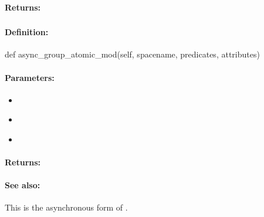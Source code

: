 \paragraph{Returns:}


\pagebreak
\subsubsection{}
\label{api:python:async_group_atomic_mod}


\paragraph{Definition:}
\begin{pythoncode}
def async_group_atomic_mod(self, spacename, predicates, attributes)
\end{pythoncode}

\paragraph{Parameters:}
\begin{itemize}[noitemsep]
\item {}\\

\item {}\\

\item {}\\

\end{itemize}

\paragraph{Returns:}


\paragraph{See also:}  This is the asynchronous form of .

\pagebreak
